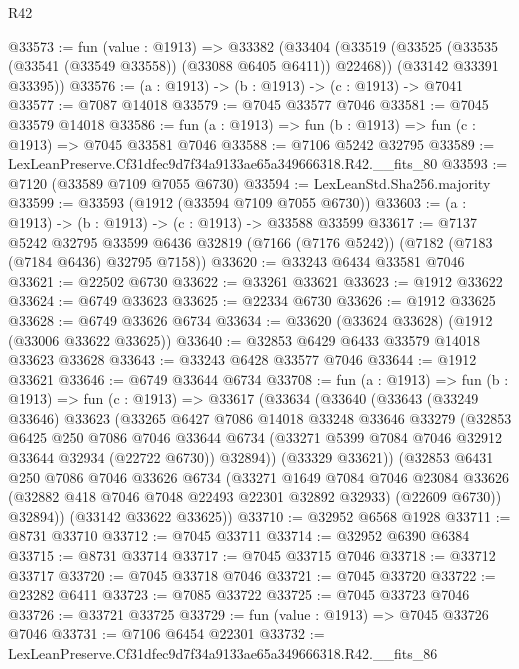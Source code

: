 \begin{lexlean}{R42}
\begin{coremodule}
{@33573 := fun (value : @1913) =>
  @33382
    (@33404
      (@33519 (@33525 (@33535 (@33541 (@33549 @33558)) (@33088 @6405 @6411)) @22468))
      (@33142 @33391 @33395))
@33576 := (a : @1913) -> (b : @1913) -> (c : @1913) -> @7041
@33577 := @7087 @14018
@33579 := @7045 @33577 @7046
@33581 := @7045 @33579 @14018
@33586 := fun (a : @1913) => fun (b : @1913) => fun (c : @1913) => @7045 @33581 @7046
@33588 := @7106 @5242 @32795
@33589 := LexLeanPreserve.Cf31dfec9d7f34a9133ae65a349666318.R42.__fits_80
@33593 := @7120 (@33589 @7109 @7055 @6730)
@33594 := LexLeanStd.Sha256.majority
@33599 := @33593 (@1912 (@33594 @7109 @7055 @6730))
@33603 := (a : @1913) -> (b : @1913) -> (c : @1913) -> @33588 @33599
@33617 := @7137
    @5242
    @32795
    @33599
    @6436
    @32819
    (@7166 (@7176 @5242))
    (@7182 (@7183 (@7184 @6436) @32795 @7158))
@33620 := @33243 @6434 @33581 @7046
@33621 := @22502 @6730
@33622 := @33261 @33621
@33623 := @1912 @33622
@33624 := @6749 @33623
@33625 := @22334 @6730
@33626 := @1912 @33625
@33628 := @6749 @33626 @6734
@33634 := @33620 (@33624 @33628) (@1912 (@33006 @33622 @33625))
@33640 := @32853 @6429 @6433 @33579 @14018 @33623 @33628
@33643 := @33243 @6428 @33577 @7046
@33644 := @1912 @33621
@33646 := @6749 @33644 @6734
@33708 := fun (a : @1913) =>
  fun (b : @1913) =>
  fun (c : @1913) =>
  @33617
    (@33634
      (@33640
        (@33643
          (@33249 @33646)
          @33623
          (@33265
            @6427
            @7086
            @14018
            @33248
            @33646
            @33279
            (@32853
              @6425
              @250
              @7086
              @7046
              @33644
              @6734
              (@33271 @5399 @7084 @7046 @32912 @33644 @32934 (@22722 @6730))
              @32894))
          (@33329 @33621))
        (@32853
          @6431
          @250
          @7086
          @7046
          @33626
          @6734
          (@33271
            @1649
            @7084
            @7046
            @23084
            @33626
            (@32882 @418 @7046 @7048 @22493 @22301 @32892 @32933)
            (@22609 @6730))
          @32894))
      (@33142 @33622 @33625))
@33710 := @32952 @6568 @1928
@33711 := @8731 @33710
@33712 := @7045 @33711
@33714 := @32952 @6390 @6384
@33715 := @8731 @33714
@33717 := @7045 @33715 @7046
@33718 := @33712 @33717
@33720 := @7045 @33718 @7046
@33721 := @7045 @33720
@33722 := @23282 @6411
@33723 := @7085 @33722
@33725 := @7045 @33723 @7046
@33726 := @33721 @33725
@33729 := fun (value : @1913) => @7045 @33726 @7046
@33731 := @7106 @6454 @22301
@33732 := LexLeanPreserve.Cf31dfec9d7f34a9133ae65a349666318.R42.__fits_86
}
\end{coremodule}
\end{lexlean}
